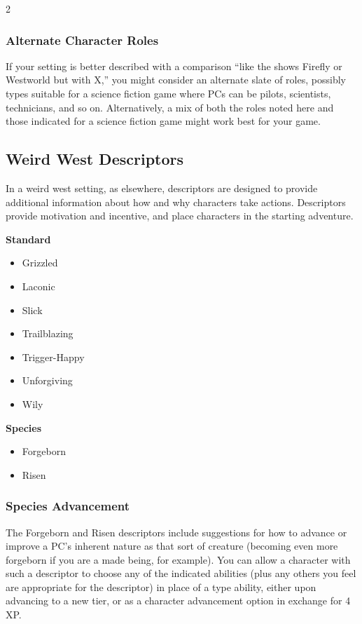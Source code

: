\begin{multicols}{2}

\subsubsection{Alternate Character Roles}

If your setting is better described with a comparison “like the shows Firefly or Westworld but with X,” you might consider an alternate slate of roles, possibly types suitable for a science fiction game where PCs can be pilots, scientists, technicians, and so on. Alternatively, a mix of both the roles noted here and those indicated for a science fiction game might work best for your game.

\subsection{Weird West Descriptors}

In a weird west setting, as elsewhere, descriptors are designed to provide additional information about how and why characters take actions. Descriptors provide motivation and incentive, and place characters in the starting adventure.

\textbf{Standard}

\begin{itemize}
\item Grizzled 
\item Laconic 
\item Slick
\item Trailblazing 
\item Trigger-Happy
\item Unforgiving
\item Wily 
\end{itemize}

\textbf{Species}
\begin{itemize} 
\item Forgeborn
\item Risen
\end{itemize}

\subsubsection{Species Advancement}

The Forgeborn and Risen descriptors include suggestions for how to advance or improve a PC’s inherent nature as that sort of creature (becoming even more forgeborn if you are a made being, for example). You can allow a character with such a descriptor to choose any of the indicated abilities (plus any others you feel are appropriate for the descriptor) in place of a type ability, either upon advancing to a new tier, or as a character advancement option in exchange for 4 XP.


\end{multicols}
